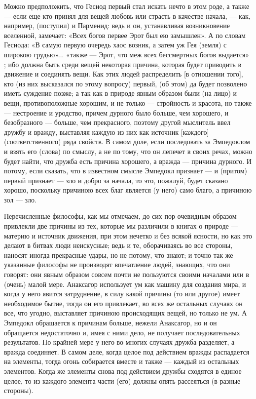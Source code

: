 \documentclass{article}
\begin{document}
Можно предположить, что Гесиод первый стал искать нечто в этом роде, а также — если еще кто принял для вещей любовь или страсть в качестве начала, — как, например, (поступил) и Парменид: ведь и он, устанавливая возникновение вселенной, замечает: «Всех богов первее Эрот был ею замышлен». А по словам Гесиода: «В самую первую очередь хаос возник, а затем уж Гея (земля) с широкою грудью»... «также — Эрот, что меж всех бессмертных богов выдается»
\footnotemark[1]
; ибо должна быть среди вещей некоторая причина, которая будет приводить в движение и соединять вещи. Как этих людей распределить [в отношении того], кто (из них высказался по этому вопросу) первый, (об этом) да будет позволено иметь суждение позже; а так как в природе явным образом были (на лицо) и вещи, противоположные хорошим, и не только — стройность и красота, но также — нестроение и уродство, причем дурного было больше, чем хорошего, и безобразного — больше, чем прекрасного, поэтому другой мыслитель ввел дружбу и вражду, выставляя каждую из них как источник [каждого] (соответственного) ряда свойств.
\footnotemark[2]
В самом доле, если последовать за Эмпедоклом и взять его (слова) по смыслу, а не по тому, что он лепечет в своих речах, можно будет найти, что дружба есть причина хорошего, а вражда — причина дурного. И потому, если сказать, что в известном смысле Эмпедокл признает — и (притом) первый признает — зло и добро за начала, то это, пожалуй, будет сказано хорошо, поскольку причиною всех благ является (у него) само благо, а причиною зол — зло.

Перечисленные философы, как мы отмечаем, до сих пор очевидным образом привлекли две причины из тех, которые мы различили в книгах о природе — материю и источник движения, при этом нечетко и без всякой ясности, но как это делают в битвах люди неискусные; ведь и те, оборачиваясь во все стороны, наносят иногда прекрасные удары, но не потому, что знают; и точно так же указанные философы не производят впечатление людей, знающих, что они говорят: они явным образом совсем почти не пользуются своими началами или в (очень) малой мере. Анаксагор использует ум как машину для создания мира, и когда у него явится затруднение, в силу какой причины (то или другое) имеет необходимое бытие, тогда он его привлекает, во всех же остальных случаях он все, что угодно, выставляет причиною происходящих вещей, но только не ум.
\footnotemark[3]
А Эмпедокл обращается к причинам больше, нежели Анаксагор, но и он обращается недостаточно и, имея с ними дело, не получает последовательных результатов. По крайней мере у него во многих случаях дружба разделяет, а вражда соединяет. В самом деле, когда целое под действием вражды распадается на элементы, тогда огонь собирается вместе и также — каждый из остальных элементов. Когда же элементы снова под действием дружбы сходятся в единое целое, то из каждого элемента части (его) должны опять рассеяться (в разные стороны).
\end{document}
